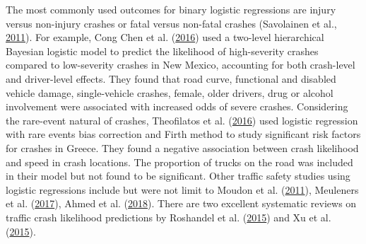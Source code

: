 \documentclass[12pt]{book}
\numberwithin{equation}{chapter}
\begin{document}
The most commonly used outcomes for binary logistic regressions are injury versus non-injury crashes or fatal versus non-fatal crashes (Savolainen et al., \protect\hyperlink{ref-savolainen2011statistical}{2011}). For example, Cong Chen et al. (\protect\hyperlink{ref-chen2016driver}{2016}) used a two-level hierarchical Bayesian logistic model to predict the likelihood of high-severity crashes compared to low-severity crashes in New Mexico, accounting for both crash-level and driver-level effects. They found that road curve, functional and disabled vehicle damage, single-vehicle crashes, female, older drivers, drug or alcohol involvement were associated with increased odds of severe crashes. Considering the rare-event natural of crashes, Theofilatos et al. (\protect\hyperlink{ref-theofilatos2016predicting}{2016}) used logistic regression with rare events bias correction and Firth method to study significant risk factors for crashes in Greece. They found a negative association between crash likelihood and speed in crash locations. The proportion of trucks on the road was included in their model but not found to be significant. Other traffic safety studies using logistic regressions include but were not limit to Moudon et al. (\protect\hyperlink{ref-moudon2011risk}{2011}), Meuleners et al. (\protect\hyperlink{ref-meuleners2017determinants}{2017}), Ahmed et al. (\protect\hyperlink{ref-ahmed2018effects}{2018}). There are two excellent systematic reviews on traffic crash likelihood predictions by Roshandel et al. (\protect\hyperlink{ref-roshandel2015impact}{2015}) and Xu et al. (\protect\hyperlink{ref-xu2015calibration}{2015}).
\end{document}
